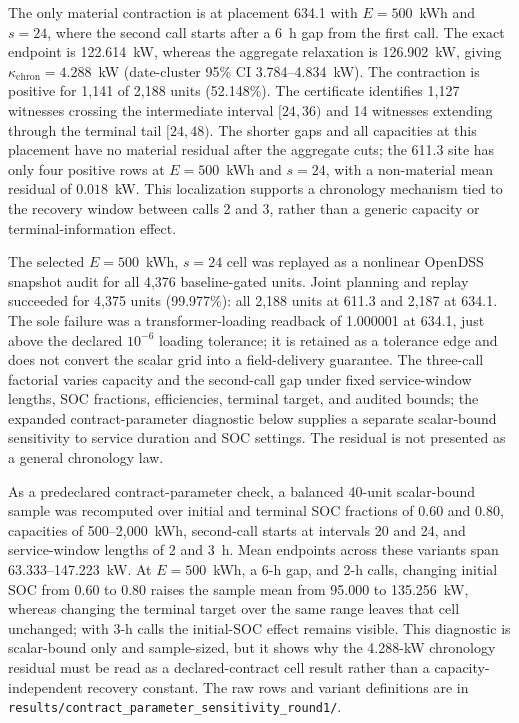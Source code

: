 \documentclass[11pt]{article}
\begin{document}
The only material contraction is at placement 634.1 with \(E=500\)~kWh and \(s=24\), where the second call starts after a 6~h gap from the first call. The exact endpoint is 122.614~kW, whereas the aggregate relaxation is 126.902~kW, giving \(\kappa_{\mathrm{chron}}=4.288\)~kW (date-cluster 95\% CI 3.784--4.834~kW). The contraction is positive for 1,141 of 2,188 units (52.148\%). The certificate identifies 1,127 witnesses crossing the intermediate interval \([24,36)\) and 14 witnesses extending through the terminal tail \([24,48)\). The shorter gaps and all capacities at this placement have no material residual after the aggregate cuts; the 611.3 site has only four positive rows at \(E=500\)~kWh and \(s=24\), with a non-material mean residual of \(0.018\)~kW. This localization supports a chronology mechanism tied to the recovery window between calls 2 and 3, rather than a generic capacity or terminal-information effect.

The selected \(E=500\)~kWh, \(s=24\) cell was replayed as a nonlinear OpenDSS snapshot audit for all 4,376 baseline-gated units. Joint planning and replay succeeded for 4,375 units (99.977\%): all 2,188 units at 611.3 and 2,187 at 634.1. The sole failure was a transformer-loading readback of 1.000001 at 634.1, just above the declared \(10^{-6}\) loading tolerance; it is retained as a tolerance edge and does not convert the scalar grid into a field-delivery guarantee. The three-call factorial varies capacity and the second-call gap under fixed service-window lengths, SOC fractions, efficiencies, terminal target, and audited bounds; the expanded contract-parameter diagnostic below supplies a separate scalar-bound sensitivity to service duration and SOC settings. The residual is not presented as a general chronology law.

As a predeclared contract-parameter check, a balanced 40-unit scalar-bound sample was recomputed over initial and terminal SOC fractions of 0.60 and 0.80, capacities of 500--2,000~kWh, second-call starts at intervals 20 and 24, and service-window lengths of 2 and 3~h. Mean endpoints across these variants span 63.333--147.223~kW. At \(E=500\)~kWh, a 6-h gap, and 2-h calls, changing initial SOC from 0.60 to 0.80 raises the sample mean from 95.000 to 135.256~kW, whereas changing the terminal target over the same range leaves that cell unchanged; with 3-h calls the initial-SOC effect remains visible. This diagnostic is scalar-bound only and sample-sized, but it shows why the 4.288-kW chronology residual must be read as a declared-contract cell result rather than a capacity-independent recovery constant. The raw rows and variant definitions are in \texttt{results/contract\_parameter\_sensitivity\_round1/}.
\end{document}
